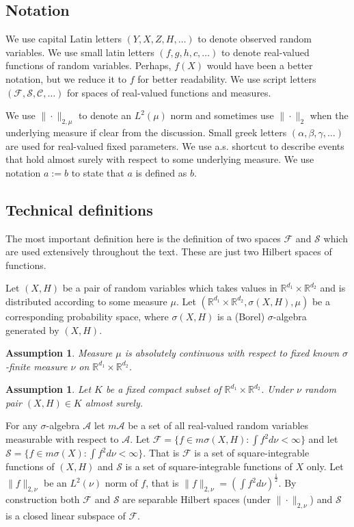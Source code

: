 \documentclass[12pt]{article}
\theoremstyle{plain}
\newtheorem{assumption}[theorem]{Assumption}
\begin{document}
\subsection{Notation}

We use capital Latin letters $(Y,X,Z,H,\dots)$ to denote observed random variables. We use small latin letters $(f,g,h,c,\dots)$ to denote real-valued functions of random variables. Perhaps, $f(X)$ would have been a better notation, but we reduce it to $f$ for better readability. We use script letters $(\mathcal{F},\mathcal{S},\mathcal{C},\dots)$ for spaces of real-valued functions and measures. 

We use $\|\cdot \|_{2,\mu}$ to denote an $L^2(\mu)$ norm and sometimes use $\|\cdot\|_2$ when the underlying measure if clear from the discussion. Small greek letters $(\alpha,\beta,\gamma,\dots)$ are used for real-valued fixed parameters. We use a.s. shortcut to describe events that hold almost surely with respect to some underlying measure. We use notation $a:=b$ to state that $a$ is defined as $b$.

\subsection{Technical definitions}

The most important definition here is the definition of two spaces $\mathcal{F}$ and $\mathcal{S}$ which are used extensively throughout the text. These are just two Hilbert spaces of functions. 

Let  $(X,H)$ be a pair of random variables which takes values in $\mathbb{R}^{d_1}\times \mathbb{R}^{d_2}$ and is distributed according to some measure $\mu$. Let $(\mathbb{R}^{d_1}\times \mathbb{R}^{d_2}, \sigma(X,H), \mu)$ be a corresponding probability space, where $\sigma(X, H)$ is a (Borel) $\sigma$-algebra generated by $(X,H)$.

\begin{assumption}\label{abs_cont}
Measure $\mu$ is absolutely continuous with respect to fixed known $\sigma$-finite measure $\nu$ on $\mathbb{R}^{d_1}\times \mathbb{R}^{d_2}$.
\end{assumption}

\begin{assumption} 
Let $K$ be a fixed compact subset of $\mathbb{R}^{d_1}\times \mathbb{R}^{d_2}$. Under $\nu$ random pair $(X,H)\in K$ almost surely.
\end{assumption}


For any $\sigma$-algebra $\mathcal{A}$ let $m\mathcal{A}$ be a set of all real-valued random variables measurable with respect to $\mathcal{A}$. Let $\mathcal{F} = \{f\in m \sigma(X,H):\int f^2d\nu <\infty\}$ and let $\mathcal{S} = \{f\in m \sigma(X): \int f^2d\nu <\infty\}$. That is $\mathcal{F}$ is a set of square-integrable functions of $(X,H)$ and $\mathcal{S}$ is a set of square-integrable functions of $X$ only. Let $\| f\|_{2,\nu}$ be an $L^2(\nu)$ norm of $f$, that is $\|f\|_{2,\nu} = \left( \int f^2d\nu\right)^{\frac12}$. By construction both $\mathcal{F}$ and $\mathcal{S}$ are separable Hilbert spaces (under $\|\cdot\|_{2,\nu}$) and $\mathcal{S}$ is a closed linear subspace of $\mathcal{F}$.
\end{document}
